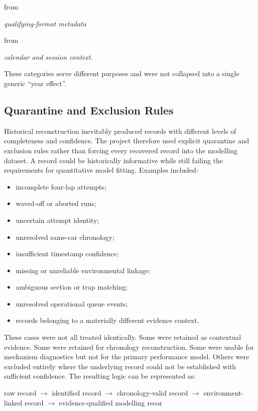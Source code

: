 from

\begin{center}\textit{qualifying-format metadata}\end{center}

from

\begin{center}\textit{calendar and session context.}\end{center}

These categories serve different purposes and were not collapsed into a single generic ``year effect''.

\subsection{Quarantine and Exclusion Rules}
Historical reconstruction inevitably produced records with different levels of completeness and confidence. The project therefore used explicit quarantine and exclusion rules rather than forcing every recovered record into the modelling dataset. A record could be historically informative while still failing the requirements for quantitative model fitting. Examples included:

\begin{itemize}
\item incomplete four-lap attempts;
\item waved-off or aborted runs;
\item uncertain attempt identity;
\item unresolved same-car chronology;
\item insufficient timestamp confidence;
\item missing or unreliable environmental linkage;
\item ambiguous section or trap matching;
\item unresolved operational queue events;
\item records belonging to a materially different evidence context.
\end{itemize}

These cases were not all treated identically. Some were retained as contextual evidence. Some were retained for chronology reconstruction. Some were usable for mechanism diagnostics but not for the primary performance model. Others were excluded entirely where the underlying record could not be established with sufficient confidence. The resulting logic can be represented as:

raw record \ensuremath{\rightarrow} identified record \ensuremath{\rightarrow} chronology-valid record \ensuremath{\rightarrow} environment-linked record \ensuremath{\rightarrow} evidence-qualified modelling recor

